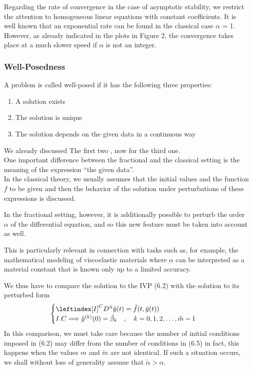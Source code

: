 Regarding the rate of convergence in the case of asymptotic stability, we restrict
the attention to homogeneous linear equations with constant coefficients. It is well
known that an exponential rate can be found in the classical case $\alpha$ = 1. However,
as already indicated in the plots in Figure 2, the convergence takes place at a much
slower speed if $\alpha$ is not an integer.

\newpage

\subsubsection{Well-Posedness}
A problem is called well-posed if it has the following three properties:
\begin{enumerate}
    \item A solution exists
    \item The solution is unique
    \item The solution depends on the given data in a continuous way
\end{enumerate}

We already discussed The first two , now for the third one.
\\
One important difference between the fractional and the classical setting is the meaning of the expression “the given data”.
\\
In the classical theory, we usually assumes that the initial values and the function $f$ to be given
and then the behavior of the solution under perturbations of these expressions is discussed. 

In the fractional setting, however, it is additionally possible to perturb the order $\alpha$ of 
the differential equation, and so this new feature must be taken into account as well. 

This is particularly relevant in connection with tasks such as, for example, the mathematical 
modeling of viscoelastic materials where $\alpha$ can be interpreted as a material constant that 
is known only up to a limited accuracy.

We thus have to compare the solution to the IVP (6.2) with the solution to its perturbed form
\begin{equation}
    \begin{cases}
        \leftindex[I]^C {D^{\tilde{\alpha}}} \tilde{y}(t) = \tilde{f}(t,\tilde{y}(t))
        \\
        I.C \Longrightarrow \tilde{y}^{(k)}(0) = \tilde{\beta}_k \quad,\quad k=0,1,2,\dots,\tilde{m}-1 
    \end{cases}
\end{equation}
In this comparison, we must take care because the number of initial conditions imposed
in (6.2) may differ from the number of conditions in (6.5) in fact, this happens when
the values $m$ and $\tilde{m}$ are not identical. If such a situation occurs, we shall without
loss of generality assume that $\tilde{\alpha} > \alpha$.

